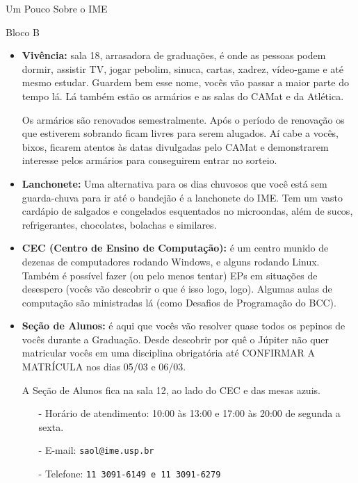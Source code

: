 \begin{secao}{Um Pouco Sobre o IME}
\begin{subsecao}{Bloco B}
\begin{itemize}
\item {\bf Vivência:} sala 18, arrasadora de graduações, é onde as pessoas podem
dormir, assistir TV, jogar pebolim, sinuca, cartas, xadrez, vídeo-game e até
mesmo estudar. Guardem bem esse nome, vocês vão passar a maior parte do tempo lá.
Lá também estão os armários e as salas do CAMat e da Atlética.

Os armários são renovados semestralmente. Após o período de renovação os que
estiverem sobrando ficam livres para serem alugados. Aí cabe a vocês, bixos, ficarem
atentos às datas divulgadas pelo CAMat e demonstrarem interesse pelos armários para
conseguirem entrar no sorteio.

\item {\bf Lanchonete:} Uma alternativa para os dias chuvosos que você está sem
  guarda-chuva para ir até o bandejão é a lanchonete do IME. Tem um vasto
  cardápio de salgados e congelados esquentados no microondas, além de sucos,
  refrigerantes, chocolates, bolachas e similares.

\end{itemize}




\begin{itemize}

\item {\bf CEC (Centro de Ensino de Computação):} é um centro munido de dezenas
de computadores rodando Windows, e alguns rodando Linux. Também é possível fazer
(ou pelo menos tentar) EPs em situações de desespero (vocês vão descobrir o que é
isso logo, logo). Algumas aulas de computação são ministradas lá (como Desafios
de Programação do BCC).

\item {\bf Seção de Alunos:} é aqui que vocês vão resolver quase todos os
pepinos de vocês durante a Graduação. Desde descobrir por quê o Júpiter não
quer matricular vocês em uma disciplina obrigatória até CONFIRMAR A MATRÍCULA
nos dias 05/03 e 06/03. %

A Seção de Alunos fica na sala 12, ao lado do CEC e das mesas azuis.
\begin{itemize}
\item[-] Horário de atendimento: 10:00 às 13:00 e 17:00 às 20:00 de segunda a sexta.
\item[-] E-mail: \tt{saol@ime.usp.br}
\item[-] Telefone: \tt{11 3091-6149} e \tt{11 3091-6279}
\end{itemize}


\end{itemize}
\end{subsecao}
\end{secao}
